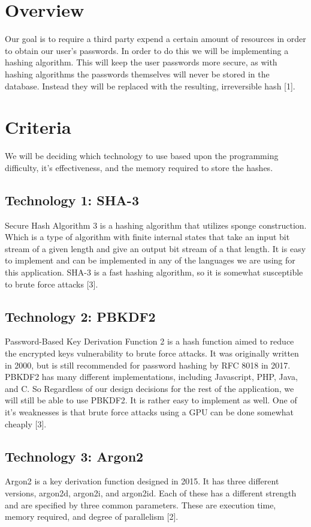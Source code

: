 \documentclass{scrreprt}
\begin{document}
\section{Overview} %
Our goal is to require a third party expend a certain amount of resources in order to obtain our user's passwords. In order to do this we will be implementing a hashing algorithm. This will keep the user passwords more secure, as with hashing algorithms the passwords themselves will never be stored in the database. Instead they will be replaced with the resulting, irreversible hash [1].

\section{Criteria}
We will be deciding which technology to use based upon the programming difficulty, it’s  effectiveness, and the memory required to store the hashes.

\subsection{Technology 1: SHA-3}
Secure Hash Algorithm 3 is a hashing algorithm that utilizes sponge construction. Which is a type of algorithm with finite internal states that take an input bit stream of a given length and give an output bit stream of a that length. It is easy to implement and can be implemented in any of the languages we are using for this application. SHA-3 is a fast hashing algorithm, so it is somewhat susceptible to brute force attacks [3]. 
\subsection{Technology 2: PBKDF2}
Password-Based Key Derivation Function 2 is a hash function aimed to reduce the encrypted keys vulnerability to brute force attacks. It was originally written in 2000, but is still recommended for password hashing by RFC 8018 in 2017. PBKDF2 has many different implementations, including Javascript, PHP, Java, and C. So Regardless of our design decisions for the rest of the application, we will still be able to use PBKDF2. It is rather easy to implement as well. One of it’s weaknesses is that brute force attacks using a GPU can be done somewhat cheaply [3].
\subsection{Technology 3: Argon2}
Argon2 is a key derivation function designed in 2015. It has three different versions, argon2d, argon2i, and argon2id. Each of these has a different strength and are specified by three common parameters. These are execution time, memory required, and degree of parallelism [2].
\end{document}
